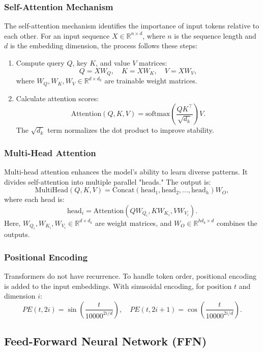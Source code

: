 \documentclass[fleqn,10pt]{SelfArx} %
\begin{document}
\subsubsection{Self-Attention Mechanism}

The self-attention mechanism identifies the importance of input tokens relative to each other. For an input sequence \(X \in \mathbb{R}^{n \times d}\), where \(n\) is the sequence length and \(d\) is the embedding dimension, the process follows these steps:
\begin{enumerate}
    \item Compute query \(Q\), key \(K\), and value \(V\) matrices:
    \[
    Q = XW_Q, \quad K = XW_K, \quad V = XW_V,
    \]
    where \(W_Q, W_K, W_V \in \mathbb{R}^{d \times d_k}\) are trainable weight matrices.
    \item Calculate attention scores:
    \[
    \text{Attention}(Q, K, V) = \text{softmax}\left(\frac{QK^\top}{\sqrt{d_k}}\right)V.
    \]
    The \(\sqrt{d_k}\) term normalizes the dot product to improve stability.
\end{enumerate}

\subsubsection{Multi-Head Attention}

Multi-head attention enhances the model's ability to learn diverse patterns. It divides self-attention into multiple parallel "heads." The output is:
\[
\text{MultiHead}(Q, K, V) = \text{Concat}(\text{head}_1, \text{head}_2, \ldots, \text{head}_h)W_O,
\]
where each head is:
\[
\text{head}_i = \text{Attention}(QW_{Q_i}, KW_{K_i}, VW_{V_i}).
\]
Here, \(W_{Q_i}, W_{K_i}, W_{V_i} \in \mathbb{R}^{d \times d_k}\) are weight matrices, and \(W_O \in \mathbb{R}^{hd_k \times d}\) combines the outputs.

\subsubsection{Positional Encoding}

Transformers do not have recurrence. To handle token order, positional encoding is added to the input embeddings. With sinusoidal encoding, for position \(t\) and dimension \(i\):
\[
PE(t, 2i) = \sin\left(\frac{t}{10000^{2i/d}}\right), \quad PE(t, 2i+1) = \cos\left(\frac{t}{10000^{2i/d}}\right).
\]

\subsection{Feed-Forward Neural Network (FFN)}
\end{document}
